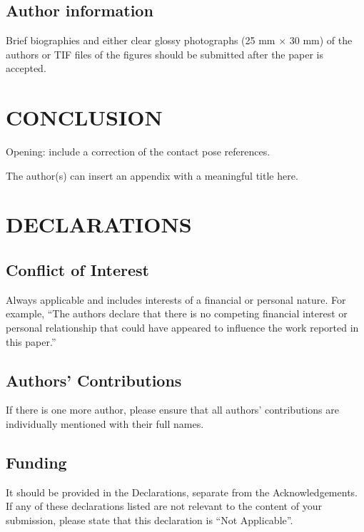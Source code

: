 \documentclass{IJCAS}
\begin{document}
\subsection{Author information}

Brief biographies and either clear glossy photographs (25 mm $\times$ 30 mm) of the authors or TIF files of the figures should be submitted after the paper is accepted.



\section{CONCLUSION}

Opening: include a correction of the contact pose references. 



\appendix

The author(s) can insert an appendix with a meaningful title here.



\section*{DECLARATIONS}

\subsection*{Conflict of Interest}
Always applicable and includes interests of a financial or personal nature. For example, ``The authors declare that there is no competing financial interest or personal relationship that could have appeared to influence the work reported in this paper.''

\subsection*{Authors' Contributions}
If there is one more author, please ensure that all authors' contributions are individually mentioned with their full names.

\subsection*{Funding }
It should be provided in the Declarations, separate from the Acknowledgements. If any of these declarations listed are not relevant to the content of your submission, please state that this declaration is ``Not Applicable''.
\end{document}

